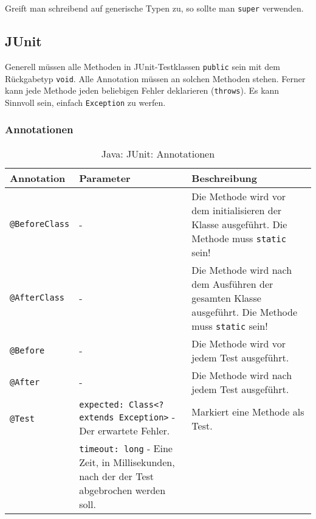 \documentclass[a4paper, 11pt, accentcolor = tud3b]{tudreport}
\begin{document}
                \noindent Greift man schreibend auf generische Typen zu, so sollte man \texttt{super} verwenden.



        \subsection{JUnit}
            Generell müssen alle Methoden in JUnit-Testklassen \texttt{public} sein mit dem Rückgabetyp \texttt{void}. Alle Annotation müssen an solchen Methoden stehen. Ferner kann jede Methode jeden beliebigen Fehler deklarieren (\texttt{throws}). Es kann Sinnvoll sein, einfach \texttt{Exception} zu werfen.

            \subsubsection{Annotationen}
                \begin{sidewaystable}
                    \centering
                    \begin{tabular}{l | p{9cm} | p{10cm}}
                        Annotation & Parameter & Beschreibung \\
                        \hline
                        \texttt{@BeforeClass} & - & Die Methode wird vor dem initialisieren der Klasse ausgeführt. Die Methode muss \texttt{static} sein! \\
                        \texttt{@AfterClass} & - & Die Methode wird nach dem Ausführen der gesamten Klasse ausgeführt. Die Methode muss \texttt{static} sein! \\
                        \texttt{@Before} & - & Die Methode wird vor jedem Test ausgeführt. \\
                        \texttt{@After} & - & Die Methode wird nach jedem Test ausgeführt. \\
                        \texttt{@Test} & \texttt{expected: Class<? extends Exception>} - Der erwartete Fehler. & Markiert eine Methode als Test. \\
                        & \texttt{timeout: long} - Eine Zeit, in Millisekunden, nach der der Test abgebrochen werden soll. & \\
                    \end{tabular}
                    \caption{Java: JUnit: Annotationen}
                \end{sidewaystable}
\end{document}
